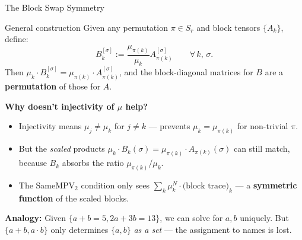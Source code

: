 \documentclass[aspectratio=169,10pt]{beamer}
\begin{document}
\begin{frame}{The Block Swap Symmetry}
\vspace{-0.5em}

\begin{block}{General construction}
Given any permutation $\pi \in S_r$ and block tensors $\{A_k\}$, define:
\[
  B_k^{[\sigma]}
  := 
  \frac{\mu_{\pi(k)}}{\mu_k}  A_{\pi(k)}^{[\sigma]}
  \qquad \forall\, k,\, \sigma.
\]
Then $\mu_k \cdot B_k^{[\sigma]} = \mu_{\pi(k)} \cdot A_{\pi(k)}^{[\sigma]}$, and
the block-diagonal matrices for $B$ are a \textbf{permutation} of those for $A$.
\end{block}

\vspace{0.3em}

\textbf{Why doesn't injectivity of $\mu$ help?}

\begin{itemize}
  \item Injectivity means $\mu_j \neq \mu_k$ for $j \neq k$
        --- prevents $\mu_k = \mu_{\pi(k)}$ for non-trivial $\pi$.
  \item But the \emph{scaled} products $\mu_k \cdot B_k(\sigma) = \mu_{\pi(k)} \cdot A_{\pi(k)}(\sigma)$
        can still match, because $B_k$ absorbs the ratio $\mu_{\pi(k)}/\mu_k$.
  \item The SameMPV$_2$ condition only sees $\sum_k \mu_k^N \cdot \text{(block trace)}_k$
        --- a \textbf{symmetric function} of the scaled blocks.
\end{itemize}

\vspace{0.3em}
\textcolor{amber}{\textbf{Analogy:}} Given $\{a + b = 5,  2a + 3b = 13\}$, we can solve
for $a, b$ uniquely. But $\{a + b,  a \cdot b\}$ only determines $\{a, b\}$
\emph{as a set} --- the assignment to names is lost.
\end{frame}
\end{document}
